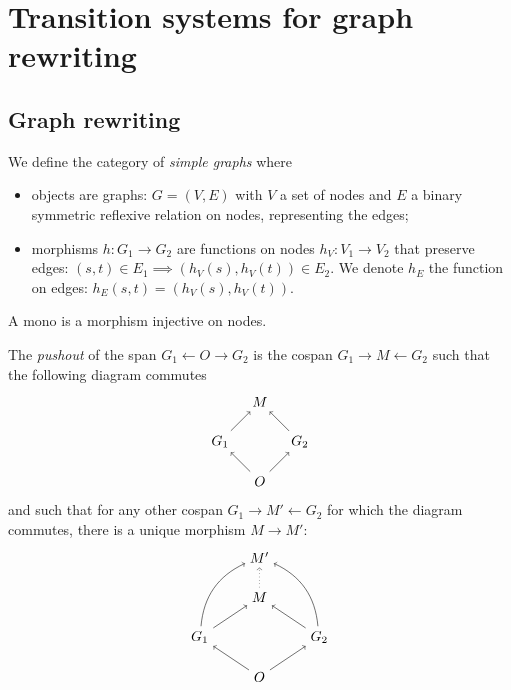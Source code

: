 \section{Transition systems for graph rewriting}

\subsection{Graph rewriting}

\begin{definition}
  We define the category of \emph{simple graphs} where
  \begin{itemize}
  \item objects are graphs: $G = (V,E)$ with $V$ a set of nodes and $E$ a binary symmetric reflexive relation on nodes, representing the edges;
  \item morphisms $h:G_1\to G_2$ are functions on nodes $h_V:V_1\to V_2$ that preserve edges: $(s,t)\in E_1\implies (h_V(s),h_V(t))\in E_2$. We denote $h_E$ the function on edges: $h_E(s,t) = (h_V(s), h_V(t))$.
  \end{itemize}
\end{definition}

A mono is a morphism injective on nodes.

\begin{definition}[Pushout]
  The \emph{pushout} of the span $G_1\leftarrow O\rightarrow G_2$ is the cospan $G_1\rightarrow M\leftarrow G_2$ such that the following diagram commutes
  \[
  \begin{tikzpicture} %
    \node (o) at (0,-1) {\(O\)};
    \node (l1) at (-1,0) {\(G_1\)};
    \node (l2) at (1,0) {\(G_2\)};
    \node (m) at (0,1) {\(M\)};
    \draw [->] (o) --  (l1);
    \draw [->] (o) --  (l2);
    \draw [->] (l1) --  (m);
    \draw [->] (l2) --  (m);
  \end{tikzpicture}
  \]
  and such that for any other cospan $G_1\rightarrow M'\leftarrow G_2$ for which the diagram commutes, there is a unique morphism $M\to M'$:
  \[
  \begin{tikzpicture} %
    \node (mp) at (0,2) {\(M'\)};
    \node (o) at (0,-1) {\(O\)};
    \node (l1) at (-1.5,0) {\(G_1\)};
    \node (l2) at (1.5,0) {\(G_2\)};
    \node (m) at (0,1) {\(M\)};
    \draw [->] (o) --  (l1);
    \draw [->] (o) --  (l2);
    \draw [->] (l1) --  (m);
    \draw [->] (l2) --  (m);
    \draw [->] (l1) to [bend left] (mp);
    \draw [->] (l2) to [bend right] (mp);
    \draw [->, dotted] (m) -- (mp);
  \end{tikzpicture}
  \]
\end{definition}

